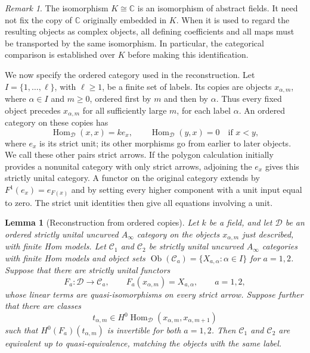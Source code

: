 \documentclass[11pt]{article}
\numberwithin{equation}{section}
\newtheorem{lemma}[theorem]{Lemma}
\theoremstyle{definition}
\theoremstyle{remark}
\newtheorem{remark}[theorem]{Remark}
\begin{document}
\begin{remark}
The isomorphism $K\cong\mathbb C$ is an isomorphism of abstract fields.  It need
not fix the copy of $\mathbb C$ originally embedded in $K$.  When it is used to
regard the resulting objects as complex objects, all defining
coefficients and all maps must be transported by the same isomorphism.
In particular, the categorical comparison is established over $K$
before making this identification.
\end{remark}

We now specify the ordered category used in the reconstruction.  Let
$I=\{1,\ldots,\ell\}$, with $\ell\ge1$, be a finite set of labels.  Its copies
are objects $x_{\alpha,m}$, where $\alpha\in I$ and $m\ge0$, ordered
first by $m$ and then by $\alpha$.  Thus every fixed object precedes
$x_{\alpha,m}$ for all sufficiently large $m$, for each label $\alpha$.
An ordered category on these copies has
\[
 \operatorname{Hom}_{\mathcal D}(x,x)=k e_x,
 \qquad
 \operatorname{Hom}_{\mathcal D}(y,x)=0\quad\text{if }x<y,
\]
where $e_x$ is its strict unit; its other morphisms go from earlier to
later objects.  We call these other pairs strict arrows.  If the polygon
calculation initially provides a nonunital category with only strict
arrows, adjoining the $e_x$ gives this strictly unital category.  A
functor on the original category extends by $F^1(e_x)=e_{F(x)}$ and by
setting every higher component with a unit input equal to zero.  The
strict unit identities then give all equations involving a unit.

\begin{lemma}[Reconstruction from ordered copies]
\label{lem:ordered-source-reconstruction}
Let $k$ be a field, and let $\mathcal D$ be an ordered strictly unital
uncurved $A_\infty$ category on the objects $x_{\alpha,m}$ just described,
with finite Hom models.  Let $\mathcal C_1$ and $\mathcal C_2$ be strictly
unital uncurved $A_\infty$ categories with finite Hom models and object
sets $\operatorname{Ob}(\mathcal C_a)=\{X_{a,\alpha}:\alpha\in I\}$
for $a=1,2$.
Suppose that there are strictly unital functors
\[
 F_a:\mathcal D\longrightarrow\mathcal C_a,
 \qquad F_a(x_{\alpha,m})=X_{a,\alpha},\qquad a=1,2,
\]
whose linear terms are quasi-isomorphisms on every strict arrow.
Suppose further that there are classes
\[
 t_{\alpha,m}\in
 H^0\operatorname{Hom}_{\mathcal D}(x_{\alpha,m},x_{\alpha,m+1})
\]
such that $H^0(F_a)(t_{\alpha,m})$ is invertible for both $a=1,2$.
Then $\mathcal C_1$ and $\mathcal C_2$ are equivalent up to
quasi-equivalence, matching the objects with the same label.
\end{lemma}
\end{document}
